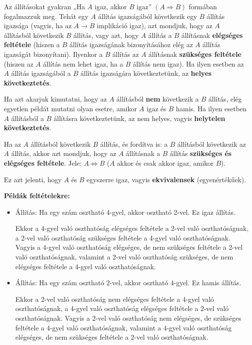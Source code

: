 \documentclass[12pt,a4paper]{article}
\begin{document}
Az állításokat gyakran „Ha $A$ igaz, akkor $B$ igaz” $(A \Rightarrow B)$ formában fogalmazzuk meg. Tehát egy $A$ állítás igazságából következik egy $B$ állítás igazsága (vagyis, ha az $A \rightarrow B$ implikáció igaz), azt mondjuk, hogy az $A$ állításból következik $B$ állítás, vagy azt, hogy $A$ állítás a $B$ állításnak \textbf{elégséges feltétele} (hiszen a $B$ állítás igazságának bizonyításához elég az $A$ állítás igazságát bizonyítani). Ilyenkor a $B$ állítás az $A$ állításnak \textbf{szükséges feltétele} (hiszen az $A$ állítás nem lehet igaz, ha a $B$ állítás nem igaz). Ha ilyen esetben az $A$ állítás igazságából a $B$ állítás igazságára következtetünk, az \textbf{helyes következtetés}.

Ha azt akarjuk kimutatni, hogy az $A$ állításból \textbf{nem} következik a $B$ állítás, elég egyetlen példát mutatni olyan esetre, amikor $A$ igaz és $B$ hamis. Ha ilyen esetben $A$ állításból a $B$ állításra következtetünk, az nem helyes, vagyis \textbf{helytelen következtetés}.

Ha az $A$ állításból következik $B$ állítás, és fordítva is: a $B$ állításból következik az $A$ állítás, akkor azt mondjuk, hogy az $A$ állításnak a $B$ állítás \textbf{szükséges és elégséges feltétele}. Jele: $A \Leftrightarrow B$ ($A$ akkor és csak akkor igaz, amikor $B$).

Ez azt jelenti, hogy $A$ és $B$ egyszerre igaz, vagyis \textbf{ekvivalensek} (egyenértékűek).

\vspace{20px}
\textbf{Példák feltételekre:}
\begin{itemize}
\item Állítás: Ha egy szám osztható 4-gyel, akkor osztható 2-vel. Ez igaz állítás.

Ekkor a 4-gyel való oszthatóság elégséges feltétele a 2-vel való oszthatóságnak, a 2-vel való oszthatóság szükséges feltétele a 4-gyel való oszthatóságnak. Vagyis a 4-gyel való oszthatóság elégséges, de nem szükséges feltétele a 2-vel való oszthatóságnak, valamint a 2-vel való oszthatóság szükséges, de nem elégséges feltétele a 4-gyel való oszthatóságnak.

\item  Állítás: Ha egy szám osztható 2-vel, akkor osztható 4-gyel. Ez hamis állítás.

Ekkor a 2-vel való oszthatóság nem elégséges feltétele a 4-gyel való oszthatóságnak, a 4-gyel való oszthatóság elégséges feltétele a 2-vel való oszthatóságnak. Vagyis a 2-vel való oszthatóság nem elégséges, de szükséges feltétele a 4-gyel való oszthatóságnak, valamint a 4-gyel való oszthatóság elégséges, de nem szükséges feltétele a 2-vel való oszthatóságnak.
\end{itemize}
\end{document}
